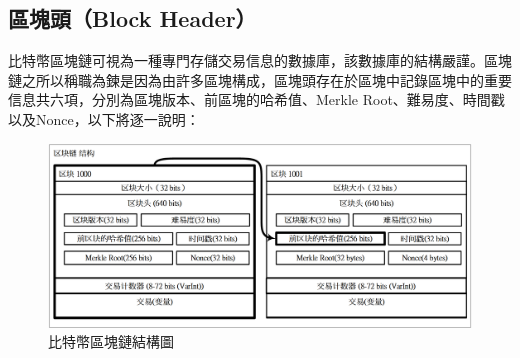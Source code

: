 			\subsection{區塊頭（Block Header）}
			比特幣區塊鏈可視為一種專門存儲交易信息的數據庫，該數據庫的結構嚴謹。區塊鏈之所以稱職為鍊是因為由許多區塊構成，區塊頭存在於區塊中記錄區塊中的重要信息共六項，分別為區塊版本、前區塊的哈希值、Merkle Root、難易度、時間戳以及Nonce，以下將逐一說明：

			\begin{figure}[htbp]
				\centering
				\includegraphics[width = 1\textwidth]{blockchain.png}
				\caption{比特幣區塊鏈結構圖}\label{blockchain}
			\end{figure}

